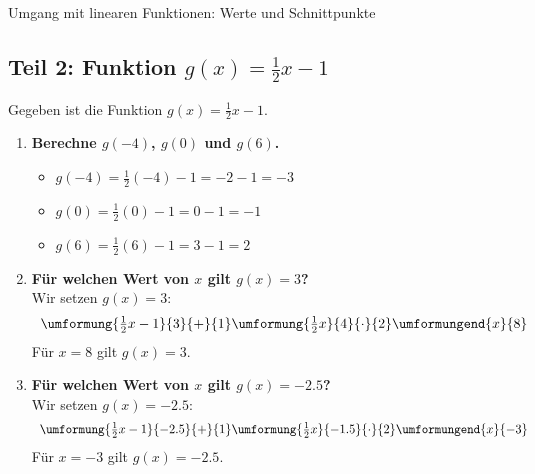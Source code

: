 \begin{loesungsumgebung}{Umgang mit linearen Funktionen: Werte und Schnittpunkte}
\bigskip %

\subsection*{Teil 2: Funktion $g(x) = \frac{1}{2}x - 1$}
Gegeben ist die Funktion $g(x) = \frac{1}{2}x - 1$.

\begin{enumerate}[label=(\alph*)]
    \item \textbf{Berechne $g(-4)$, $g(0)$ und $g(6)$.}
    \begin{itemize}
        \item $g(-4) = \frac{1}{2}(-4) - 1 = -2 - 1 = -3$
        \item $g(0) = \frac{1}{2}(0) - 1 = 0 - 1 = -1$
        \item $g(6) = \frac{1}{2}(6) - 1 = 3 - 1 = 2$
    \end{itemize}

    \item \textbf{Für welchen Wert von $x$ gilt $g(x) = 3$?} \\
    Wir setzen $g(x)=3$:
    $$
    \begin{array}{r c l c l}
    \umformung{\frac{1}{2}x - 1}{3}{+}{1}
    \umformung{\frac{1}{2}x}{4}{\cdot}{2}
    \umformungend{x}{8}
    \end{array}
    $$
    Für $x=8$ gilt $g(x)=3$.

    \item \textbf{Für welchen Wert von $x$ gilt $g(x) = -2.5$?} \\
    Wir setzen $g(x)=-2.5$:
    $$
    \begin{array}{r c l c l}
    \umformung{\frac{1}{2}x - 1}{-2.5}{+}{1}
    \umformung{\frac{1}{2}x}{-1.5}{\cdot}{2}
    \umformungend{x}{-3}
    \end{array}
    $$
    Für $x=-3$ gilt $g(x)=-2.5$.


\end{enumerate}
\end{loesungsumgebung}
